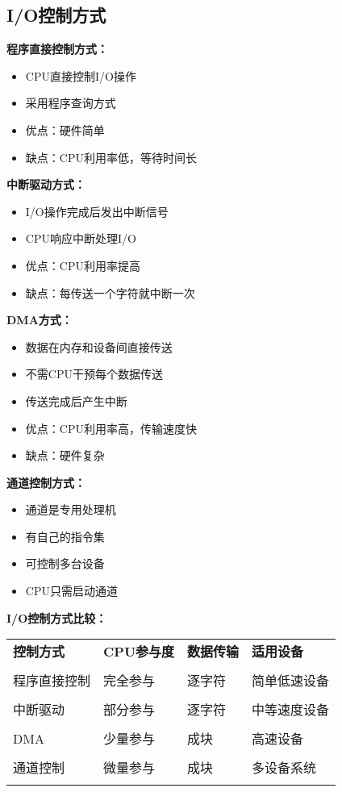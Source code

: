 \documentclass[lang=cn,newtx,10pt,scheme=chinese]{../../elegantbook}
\begin{document}
\subsection{I/O控制方式}

\textbf{程序直接控制方式：}
\begin{itemize}
  \item CPU直接控制I/O操作
  \item 采用程序查询方式
  \item 优点：硬件简单
  \item 缺点：CPU利用率低，等待时间长
\end{itemize}

\textbf{中断驱动方式：}
\begin{itemize}
  \item I/O操作完成后发出中断信号
  \item CPU响应中断处理I/O
  \item 优点：CPU利用率提高
  \item 缺点：每传送一个字符就中断一次
\end{itemize}

\textbf{DMA方式：}
\begin{itemize}
  \item 数据在内存和设备间直接传送
  \item 不需CPU干预每个数据传送
  \item 传送完成后产生中断
  \item 优点：CPU利用率高，传输速度快
  \item 缺点：硬件复杂
\end{itemize}

\textbf{通道控制方式：}
\begin{itemize}
  \item 通道是专用处理机
  \item 有自己的指令集
  \item 可控制多台设备
  \item CPU只需启动通道
\end{itemize}

\textbf{I/O控制方式比较：}
\begin{longtable}{@{}p{3cm}p{3cm}p{3cm}p{4cm}@{}}
\toprule
\textbf{控制方式} & \textbf{CPU参与度} & \textbf{数据传输} & \textbf{适用设备} \\\\ \midrule
\endhead

程序直接控制 & 完全参与 & 逐字符 & 简单低速设备 \\\\
中断驱动 & 部分参与 & 逐字符 & 中等速度设备 \\\\
DMA & 少量参与 & 成块 & 高速设备 \\\\
通道控制 & 微量参与 & 成块 & 多设备系统 \\\\

\bottomrule
\end{longtable}
\end{document}
